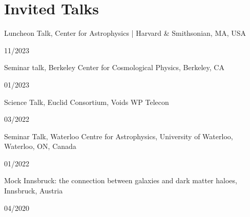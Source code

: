 \documentclass[12pt, a4paper]{article} %
\begin{document}
\section*{Invited Talks}

\begin{minipage}[t]{0.7\textwidth}
\begin{flushleft}%
\setlength{\leftskip}{0.2cm}%
Luncheon Talk, Center for Astrophysics | Harvard \& Smithsonian, MA, USA
\end{flushleft}
\end{minipage}
\begin{minipage}[t]{0.3\textwidth}
\hfill 11/2023
\end{minipage}
\vspace{0.2cm}


\begin{minipage}[t]{0.7\textwidth}
\begin{flushleft}%
  \setlength{\leftskip}{0.2cm}%
Seminar talk, Berkeley Center for Cosmological Physics, Berkeley, CA
\end{flushleft}
\end{minipage}
\begin{minipage}[t]{0.3\textwidth}
\hfill 01/2023
\end{minipage}
\vspace{0.2cm}

\begin{minipage}[t]{0.7\textwidth}
\begin{flushleft}%
  \setlength{\leftskip}{0.2cm}%
Science Talk, Euclid Consortium, Voids WP Telecon
\end{flushleft}
\end{minipage}
\begin{minipage}[t]{0.3\textwidth}
\hfill 03/2022
 \end{minipage}
\vspace{0.2cm}

\begin{minipage}[t]{0.7\textwidth}
\begin{flushleft}%
  \setlength{\leftskip}{0.2cm}%
Seminar Talk, Waterloo Centre for Astrophysics, University of Waterloo, Waterloo, ON, Canada
\end{flushleft}
\end{minipage}
\begin{minipage}[t]{0.3\textwidth}
\hfill 01/2022
\end{minipage}
\vspace{0.2cm}

\begin{minipage}[t]{0.7\textwidth}
\begin{flushleft}%
  \setlength{\leftskip}{0.2cm}%
Mock Innsbruck: the connection between galaxies and dark matter haloes, Innsbruck, Austria
\end{flushleft}
\end{minipage}
\begin{minipage}[t]{0.3\textwidth}
\hfill 04/2020
\end{minipage}
\vspace{0.2cm}
\end{document}
